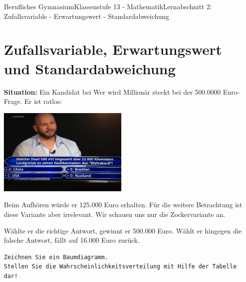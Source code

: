 \documentclass[11pt,twocolumn,oneside,openany,headings=optiontotoc,11pt,numbers=noenddot]{article}
\begin{document}
	\begin{worksheet}{Berufliches Gymnasium}{Klassenstufe 13 - Mathematik}{Lernabschnitt 2: Zufallsvariable - Erwartungswert - Standardabweichung}
		\setcounter{section}{5}
		\section{Zufallsvariable, Erwartungswert und Standardabweichung}
		\textbf{Situation:} Ein Kandidat bei \glqq{}Wer wird Millionär\grqq{} steckt bei der 500.0000 Euro-Frage. Er ist ratlos:\\
		\par\noindent
		\includegraphics[width=0.48\textwidth]{../99_Bilder/04_WKR/wwm.jpg}\\
		\par\noindent
		Beim Aufhören würde er 125.000 Euro erhalten. Für die weitere Betrachtung ist diese Variante aber irrelevant. Wir schauen uns nur die \grqq{}Zockervariante\grqq{} an.\\
		\par\noindent
		Wählte er die richtige Antwort, gewinnt er 500.000 Euro. Wählt er hingegen die falsche Antwort, fällt auf 16.000 Euro zurück.\\
		\par\noindent
		\texttt{\footnotesize{Zeichnen Sie ein Baumdiagramm.\\Stellen Sie die Wahrscheinlichkeitsverteilung mit Hilfe der Tabelle dar!}}
	\end{worksheet}
\end{document}
